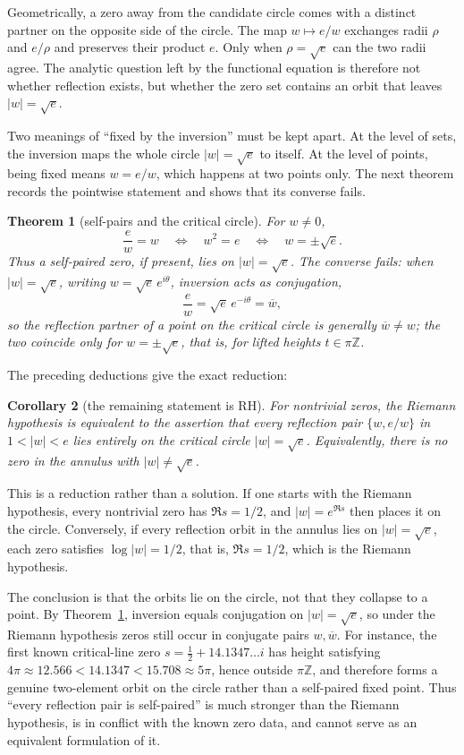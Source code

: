 \documentclass[submission,noinfoline]{jsfds}
\newtheorem{theorem}{Theorem}
\newtheorem{corollary}[theorem]{Corollary}
\begin{document}
Geometrically, a zero away from the candidate circle comes with a distinct
partner on the opposite side of the circle. The map $w\mapsto e/w$ exchanges
radii $\rho$ and $e/\rho$ and preserves their product $e$. Only when
$\rho=\sqrt e$ can the two radii agree. The analytic question left by the
functional equation is therefore not whether reflection exists, but whether
the zero set contains an orbit that leaves $|w|=\sqrt e$.

Two meanings of ``fixed by the inversion'' must be kept apart. At the level of
sets, the inversion maps the whole circle $|w|=\sqrt e$ to itself. At the
level of points, being fixed means $w=e/w$, which happens at two points only.
The next theorem records the pointwise statement and shows that its converse
fails.

\begin{theorem}[self-pairs and the critical circle]\label{thm:selfpair}
For $w\neq0$,
\[
  \frac ew=w
  \quad\Longleftrightarrow\quad
  w^2=e
  \quad\Longleftrightarrow\quad
  w=\pm\sqrt e.
\]
Thus a self-paired zero, if present, lies on $|w|=\sqrt e$. The converse
fails: when $|w|=\sqrt e$, writing $w=\sqrt e\,e^{i\theta}$, inversion acts as
conjugation,
\[
  \frac ew=\sqrt e\,e^{-i\theta}=\overline w ,
\]
so the reflection partner of a point on the critical circle is generally
$\overline w\neq w$; the two coincide only for $w=\pm\sqrt e$, that is, for
lifted heights $t\in\pi\mathbb Z$.
\end{theorem}

The preceding deductions give the exact reduction:

\begin{corollary}[the remaining statement is RH]\label{cor:rh-reduction}
For nontrivial zeros, the Riemann hypothesis is equivalent to the assertion
that every reflection pair $\{w,e/w\}$ in $1<|w|<e$ lies entirely on the
critical circle $|w|=\sqrt e$. Equivalently, there is no zero in the annulus
with $|w|\neq\sqrt e$.
\end{corollary}

This is a reduction rather than a solution. If one starts with the Riemann
hypothesis, every nontrivial zero has $\Re s=1/2$, and $|w|=e^{\Re s}$ then
places it on the circle. Conversely, if every reflection orbit in the annulus
lies on $|w|=\sqrt e$, each zero satisfies $\log|w|=1/2$, that is,
$\Re s=1/2$, which is the Riemann hypothesis.

The conclusion is that the orbits lie on the circle, not that they collapse
to a point. By Theorem~\ref{thm:selfpair}, inversion equals conjugation on
$|w|=\sqrt e$, so under the Riemann hypothesis zeros still occur in conjugate
pairs $w,\overline w$. For instance, the first known critical-line zero
$s=\tfrac12+14.1347\ldots i$ has height satisfying
$4\pi\approx12.566<14.1347<15.708\approx5\pi$, hence outside $\pi\mathbb Z$,
and therefore forms a genuine two-element orbit on the circle rather than a
self-paired fixed point. Thus ``every reflection pair is self-paired'' is much stronger
than the Riemann hypothesis, is in conflict with the known zero data, and
cannot serve as an equivalent formulation of it.
\end{document}
